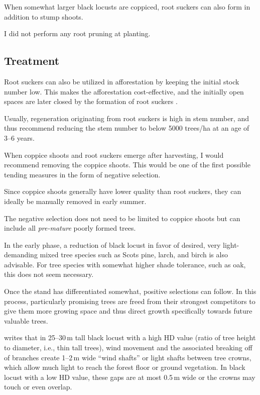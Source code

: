 When somewhat larger black locusts are coppiced, root suckers can also form in addition to stump shoots.

I did not perform any root pruning at planting.

\subsection{Treatment}

Root suckers can also be utilized in afforestation by keeping the initial 
stock number low. This makes the afforestation cost-effective, and the 
initially open spaces are later closed by the formation of root suckers 
\citep{larsen1935robinieWurzelbrut}.

Usually, regeneration originating from root suckers is high in stem number, 
and thus \citet{redei2012robinieVerj} recommend reducing the stem number to 
below 5000 trees/ha at an age of 3--6 years.

When coppice shoots and root suckers emerge after harvesting, I would 
recommend removing the coppice shoots. This would be one of the first 
possible tending measures in the form of negative selection.

Since coppice shoots generally have lower quality than root suckers, they 
can ideally be manually removed in early summer.

The negative selection does not need to be limited to coppice shoots but can 
include all \emph{pre-mature} poorly formed trees.

In the early phase, a reduction of black locust in favor of desired, very 
light-demanding mixed tree species such as Scots pine, larch, and birch is 
also advisable. For tree species with somewhat higher shade tolerance, such 
as oak, this does not seem necessary.

Once the stand has differentiated somewhat, positive selections can follow. 
In this process, particularly promising trees are freed from their strongest 
competitors to give them more growing space and thus direct growth 
specifically towards future valuable trees.

\citet[p.~47]{bluemke1955robinie} writes that in 25--30\,m tall black locust 
with a high HD value (ratio of tree height to diameter, i.e., thin tall 
trees), wind movement and the associated breaking off of branches create 1--2\,m 
wide \enquote{wind shafts} or light shafts between tree crowns, which allow much 
light to reach the forest floor or ground vegetation. In black locust with a 
low HD value, these gaps are at most 0.5\,m wide or the crowns may touch or 
even overlap.


